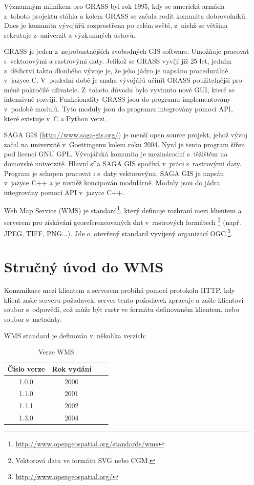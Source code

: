 \documentclass[a4paper,12pt]{article}
\begin{document}
 
Významným milníkem pro GRASS byl rok 1995, kdy se americká armáda
z~tohoto projektu stáhla a kolem GRASS se začala rodit komunita
dobrovolníků.  Dnes je komunita vývojářů rozprostřena po celém světě,
z~nichž se většina rekrutuje z~univerzit a výzkumných ústavů.

GRASS je jeden z~nejrobustnějších svobodných GIS software. Umožňuje
pracovat s~vektorovými a rastrovými daty.  Jelikož se GRASS vyvíjí již
25 let, jedním z~dědictví takto dlouhého vývoje je, že jeho jádro je
napsáno procedurálně v~jazyce C.  V~poslední době je snaha vývojářů
učinit GRASS použitelnější pro méně pokročilé uživatele. Z~tohoto
důvodu bylo vyvinuto nové GUI, které se intenzivně rozvíjí.
Funkcionality GRASS jsou do programu implementovány v~podobě
modulů. Tyto moduly jsou do programu integrovány pomocí API, které existuje
v~C a Python verzi.

SAGA GIS (\url{http://www.saga-gis.org/}) je menší open source
projekt, jehož vývoj začal na univerzitě v~Goettingenu kolem roku
2004. Nyní je tento program šířen pod licencí GNU GPL. Vývojářská
komunita je mezinárodní s~těžištěm na domovské univerzitě. Hlavní síla
SAGA GIS spočívá v~práci s~rastrovými daty. Program je schopen
pracovat i s~daty vektorovými.  SAGA GIS je napsán v~jazyce C++ a je
rovněž koncipován modulárně. Moduly jsou do jádra integrovány pomocí
API v~jazyce C++.

Web Map Service (WMS) je
standard\footnote{\url{http://www.opengeospatial.org/standards/wms}},
který definuje rozhraní mezi klientem a serverem pro získávání
georeferencovaných dat v~rastrových formátech \footnote{ Vektorová
  data ve formátu SVG nebo CGM.} (např. JPEG, TIFF, PNG...).  Jde
o~otevřený standard vyvíjený organizací
OGC.\footnote{\url{http://www.opengeospatial.org/}}.

\newpage
\section{Stručný úvod do WMS}

Komunikace mezi klientem a serverem probíhá pomocí protokolu HTTP, kdy
klient zašle serveru požadavek, server tento požadavek zpracuje a zašle
klientovi soubor s~odpovědí, což může být rastr ve formátu definovaném
klientem, nebo soubor s~metadaty.

WMS standard je definován v~několika verzích:

\begin{table}[h]
\centering
\begin{tabular}{|c|c|c|c|}      \hline
  Číslo verze  & Rok vydání  \\ \hline
  1.0.0        &  2000       \\ \hline
  1.1.0        &  2001       \\ \hline
  1.1.1        &  2002       \\ \hline
  1.3.0        &  2004       \\ \hline
\end{tabular}
\caption{Verze WMS}
\label{tab:verze}
\end{table}
\end{document}
